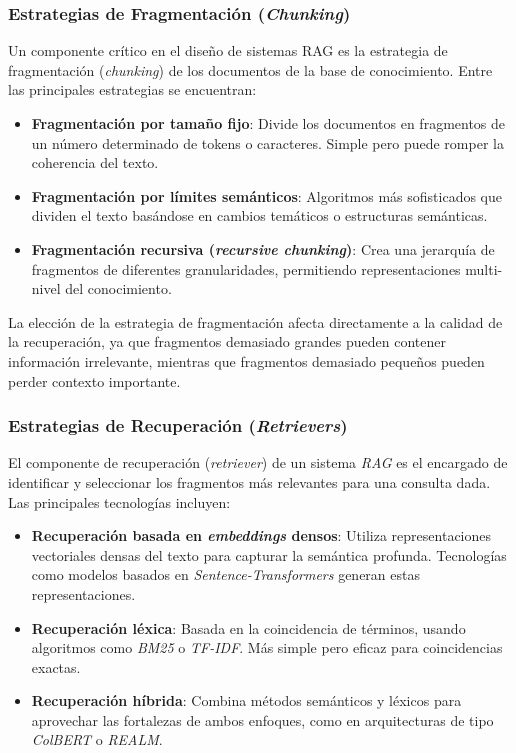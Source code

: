 \documentclass[12pt,letterpaper]{article}
\begin{document}
\subsubsection{Estrategias de Fragmentación (\textit{Chunking})}

Un componente crítico en el diseño de sistemas RAG es la estrategia de fragmentación (\textit{chunking}) de los documentos de la base de conocimiento. Entre las principales estrategias se encuentran:

\begin{itemize}
    \item \textbf{Fragmentación por tamaño fijo}: Divide los documentos en fragmentos de un número determinado de tokens o caracteres. Simple pero puede romper la coherencia del texto.

    \item \textbf{Fragmentación por límites semánticos}: Algoritmos más sofisticados que dividen el texto basándose en cambios temáticos o estructuras semánticas.

    \item \textbf{Fragmentación recursiva (\textit{recursive chunking})}: Crea una jerarquía de fragmentos de diferentes granularidades, permitiendo representaciones multi-nivel del conocimiento.
\end{itemize}

La elección de la estrategia de fragmentación afecta directamente a la calidad de la recuperación, ya que fragmentos demasiado grandes pueden contener información irrelevante, mientras que fragmentos demasiado pequeños pueden perder contexto importante.

\subsubsection{Estrategias de Recuperación (\textit{Retrievers})}

El componente de recuperación (\textit{retriever}) de un sistema \textit{RAG} es el encargado de identificar y seleccionar los fragmentos más relevantes para una consulta dada. Las principales tecnologías incluyen:

\begin{itemize}
    \item \textbf{Recuperación basada en \textit{embeddings} densos}: Utiliza representaciones vectoriales densas del texto para capturar la semántica profunda. Tecnologías como modelos basados en \textit{Sentence-Transformers} generan estas representaciones.

    \item \textbf{Recuperación léxica}: Basada en la coincidencia de términos, usando algoritmos como \textit{BM25} \cite{robertson1995okapi} o \textit{TF-IDF}. Más simple pero eficaz para coincidencias exactas.

    \item \textbf{Recuperación híbrida}: Combina métodos semánticos y léxicos para aprovechar las fortalezas de ambos enfoques, como en arquitecturas de tipo \textit{ColBERT} o \textit{REALM}.

\end{itemize}
\end{document}
